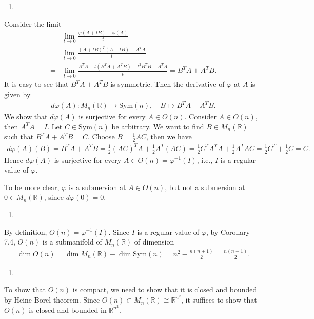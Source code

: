 \begin{enumerate}
    \item [2.]
\end{enumerate}
Consider the limit 
\begin{align}
    &\lim_{t\to 0}\frac{\varphi(A+tB)-\varphi(A)}{t}\\
    =&\lim_{t\to 0}\frac{(A+tB)^T(A+tB)-A^TA}{t}\\
    =&\lim_{t\to 0}\frac{A^TA+t(B^TA+A^TB)+t^2B^TB-A^TA}{t}=B^TA+A^TB.
\end{align}
It is easy to see that $B^T A+A^TB$ is symmetric. Then the derivative of $\varphi$ at $A$ is given by
\begin{align}
    d\varphi(A):M_n(\mathbb{R})\to \mathrm{Sym}(n),\quad B\mapsto B^TA+A^TB.
\end{align}
We show that $d\varphi(A)$ is surjective for every $A\in O(n)$. Consider $A\in O(n)$, then $A^TA=I$. Let $C\in\mathrm{Sym}(n)$ be arbitrary. We want to find $B\in M_n(\mathbb{R})$ such that $B^TA+A^TB=C$. Choose $B=\frac{1}{2}AC$, then we have
\begin{align}
    d\varphi(A)(B)=B^TA+A^TB=\frac{1}{2}(AC)^TA+\frac{1}{2}A^T(AC)=\frac{1}{2}C^TA^TA+\frac{1}{2}A^TAC=\frac{1}{2}C^T+\frac{1}{2}C=C.
\end{align}
Hence $d\varphi(A)$ is surjective for every $A\in O(n)=\varphi^{-1}(I)$, i.e., $I$ is a regular value of $\varphi$. 

To be more clear, $\varphi$ is a submersion at $A\in O(n)$, but not a submersion at $0\in M_n(\mathbb{R})$, since $d\varphi(0)=0$.

\begin{enumerate}
    \item [3.]
\end{enumerate}
By definition, $O(n)=\varphi^{-1}(I)$. Since $I$ is a regular value of $\varphi$, by Corollary 7.4, $O(n)$ is a submanifold of $M_n(\mathbb{R})$ of dimension
\begin{align}
    \dim O(n)=\dim M_n(\mathbb{R})-\dim \mathrm{Sym}(n)=n^2-\frac{n(n+1)}{2}=\frac{n(n-1)}{2}.
\end{align} 

\begin{enumerate}
    \item [4.]
\end{enumerate}
To show that $O(n)$ is compact, we need to show that it is closed and bounded by Heine-Borel theorem. Since $O(n)\subset M_n(\mathbb{R})\cong\mathbb{R}^{n^2}$, it suffices to show that $O(n)$ is closed and bounded in $\mathbb{R}^{n^2}$.

